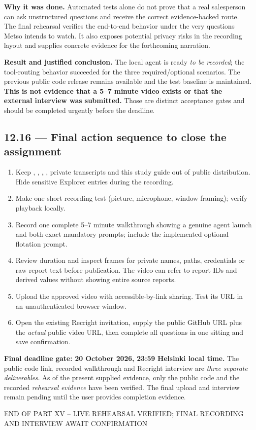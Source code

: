 \documentclass[11pt,a4paper]{article}
\DeclareRobustCommand{\code}[1]{{\ttfamily\small\detokenize{#1}}}
\begin{document}
\textbf{Why it was done.} Automated tests alone do not prove that a real salesperson can ask unstructured questions and receive the correct evidence-backed route. The final rehearsal verifies the end-to-end behavior under the very questions Metso intends to watch. It also exposes potential privacy risks in the recording layout and supplies concrete evidence for the forthcoming narration.

\textbf{Result and justified conclusion.} The local agent is ready \emph{to be recorded}; the tool-routing behavior succeeded for the three required/optional scenarios. The previous public code release remains available and the test baseline is maintained. \textbf{This is not evidence that a 5--7 minute video exists or that the external interview was submitted.} Those are distinct acceptance gates and should be completed urgently before the deadline.

\subsection{12.16 --- Final action sequence to close the assignment}
\begin{enumerate}
\item Keep \code{project.zip}, \code{.env}, \code{raw/}, \code{docs/private/}, private transcripts and this study guide out of public distribution. Hide sensitive Explorer entries during the recording.
\item Make one short recording test (picture, microphone, window framing); verify playback locally.
\item Record one complete 5--7 minute walkthrough showing a genuine agent launch and both exact mandatory prompts; include the implemented optional flotation prompt.
\item Review duration and inspect frames for private names, paths, credentials or raw report text before publication. The video can refer to report IDs and derived values without showing entire source reports.
\item Upload the approved video with accessible-by-link sharing. Test its URL in an unauthenticated browser window.
\item Open the existing Recright invitation, supply the public GitHub URL plus the \emph{actual} public video URL, then complete all questions in one sitting and save confirmation.
\end{enumerate}
\begin{warnbox}
\textbf{Final deadline gate: 20 October 2026, 23:59 Helsinki local time.} The public code link, recorded walkthrough and Recright interview are \emph{three separate deliverables}. As of the present supplied evidence, only the public code and the recorded \emph{rehearsal evidence} have been verified. The final upload and interview remain pending until the user provides completion evidence.
\end{warnbox}

\begin{center}
{\sffamily\color{Gray}\footnotesize END OF PART XV -- LIVE REHEARSAL VERIFIED; FINAL RECORDING AND INTERVIEW AWAIT CONFIRMATION}
\end{center}
\end{document}
